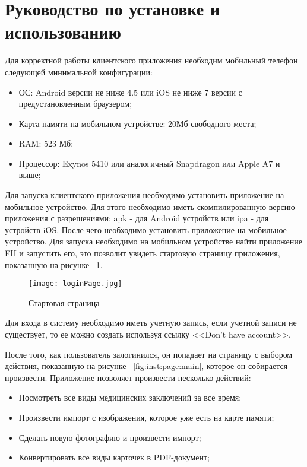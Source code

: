 \section{Руководство по установке и использованию}
\label{sec:inst}

Для корректной работы клиентского приложения необходим мобильный телефон следующей минимальной конфигурации:

\begin{itemize}
  \item ОС: Android версии не ниже 4.5 или iOS не ниже 7 версии с предустановленным браузером;
  \item Карта памяти на мобильном устройстве: 20Мб свободного места;
  \item RAM: 523 Мб;
  \item Процессор: Exynos 5410 или аналогичный Snapdragon или Apple A7 и выше;
\end{itemize}

Для запуска клиентского приложения необходимо установить приложение на мобильное устройство. Для этого необходимо иметь скомпилированную версию приложения с разрешениями: apk - для Android устройств или ipa - для устройств iOS. После чего необходимо установить приложение на мобильное устройство. Для запуска необходимо на мобильном устройстве найти приложение FH и запустить его, это позволит увидеть стартовую страницу приложения, показанную на рисунке ~\ref{fig:inst:page:login}.
\begin{figure}[ht]
\centering
  \texttt{[image: loginPage.jpg]}  
  \caption{ Стартовая страница }
  \label{fig:inst:page:login}
\end{figure}

Для входа в систему необходимо иметь учетную запись, если учетной записи не существует, то ее можно создать используя ссылку <<Don't have account>>.

После того, как пользователь залогинился, он попадает на страницу с выбором действия, показанную на рисунке ~\ref{fig:inst:page:main}, которое он собирается произвести. Приложение позволяет произвести несколько действий:
\begin{itemize}
  \item Посмотреть все виды медицинских заключений за все время;
  \item Произвести импорт с изображения, которое уже есть на карте памяти;
  \item Сделать новую фотографию и произвести импорт;
  \item Конвертировать все виды карточек в PDF-документ;
\end{itemize}

